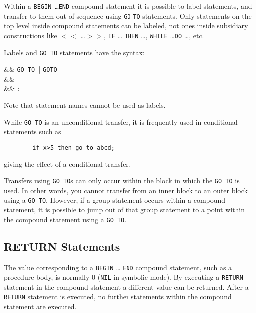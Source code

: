Within a \texttt{BEGIN \ldots END} compound
statement it is possible to label statements, and transfer to them out of
sequence using \texttt{GO} \texttt{TO} statements.  Only statements on the top
level inside compound statements can be labeled, not ones inside
subsidiary constructions like \texttt{$<<$} \ldots \texttt{$>>$}, \texttt{IF} \ldots
\texttt{THEN} \ldots , \texttt{WHILE} \ldots \texttt{DO} \ldots , etc.

Labels and \texttt{GO TO} statements have the syntax:
\begin{syntaxtable}
   &\BNFprod& \texttt{GO TO }|%
                                    \texttt{GOTO } \\
   &\BNFprod& \\
   &\BNFprod& \texttt{:}
\end{syntaxtable}
Note that statement names cannot be used as labels.

While \texttt{GO TO} is an unconditional transfer, it is frequently used
in conditional statements such as
\begin{verbatim}
        if x>5 then go to abcd;
\end{verbatim}
giving the effect of a conditional transfer.

Transfers using \texttt{GO TO}s can only occur within the block in which the
\texttt{GO TO} is used.  In other words, you cannot transfer from an inner
block to an outer block using a \texttt{GO TO}.  However, if a group statement
occurs within a compound statement, it is possible to jump out of that group
statement to a point within the compound statement using a \texttt{GO TO}.

\subsection{RETURN Statements}
\hypertarget{command:RETURN}{}

The value corresponding to a \texttt{BEGIN} \ldots{} \texttt{END} compound
statement,
 such as a procedure body, is normally 0
(\texttt{NIL} in symbolic mode).  By executing a \texttt{RETURN}
statement in the compound statement a different value can be returned.
After a \texttt{RETURN} statement is executed, no further statements within
the compound statement are executed.

